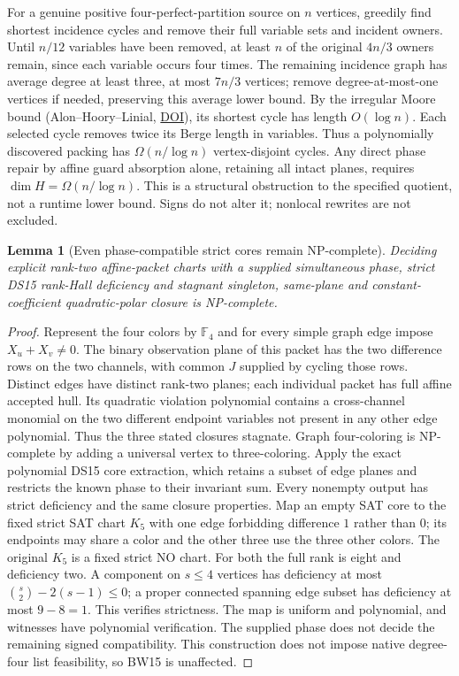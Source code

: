 \documentclass[11pt]{article}
\newtheorem{lemma}[theorem]{Lemma}
\begin{document}
For a genuine positive four-perfect-partition source on $n$ vertices, greedily find shortest incidence cycles and remove their full variable sets and incident owners. Until $n/12$ variables have been removed, at least $n$ of the original $4n/3$ owners remain, since each variable occurs four times. The remaining incidence graph has average degree at least three, at most $7n/3$ vertices; remove degree-at-most-one vertices if needed, preserving this average lower bound. By the irregular Moore bound (Alon--Hoory--Linial, \href{https://doi.org/10.1007/S003730200002}{DOI}), its shortest cycle has length $O(\log n)$. Each selected cycle removes twice its Berge length in variables. Thus a polynomially discovered packing has $\Omega(n/\log n)$ vertex-disjoint cycles. Any direct phase repair by affine guard absorption alone, retaining all intact planes, requires $\dim H=\Omega(n/\log n)$. This is a structural obstruction to the specified quotient, not a runtime lower bound. Signs do not alter it; nonlocal rewrites are not excluded.

\begin{lemma}[Even phase-compatible strict cores remain NP-complete]\label{lem:ba17-hard}
Deciding explicit rank-two affine-packet charts with a supplied simultaneous phase, strict DS15 rank-Hall deficiency and stagnant singleton, same-plane and constant-coefficient quadratic-polar closure is NP-complete.
\end{lemma}
\begin{proof}
Represent the four colors by $\mathbb F_4$ and for every simple graph edge impose $X_u+X_v\ne0$. The binary observation plane of this packet has the two difference rows on the two channels, with common $J$ supplied by cycling those rows. Distinct edges have distinct rank-two planes; each individual packet has full affine accepted hull. Its quadratic violation polynomial contains a cross-channel monomial on the two different endpoint variables not present in any other edge polynomial. Thus the three stated closures stagnate. Graph four-coloring is NP-complete by adding a universal vertex to three-coloring. Apply the exact polynomial DS15 core extraction, which retains a subset of edge planes and restricts the known phase to their invariant sum. Every nonempty output has strict deficiency and the same closure properties. Map an empty SAT core to the fixed strict SAT chart $K_5$ with one edge forbidding difference $1$ rather than $0$; its endpoints may share a color and the other three use the three other colors. The original $K_5$ is a fixed strict NO chart. For both the full rank is eight and deficiency two. A component on $s\le4$ vertices has deficiency at most $\binom{s}{2}-2(s-1)\le0$; a proper connected spanning edge subset has deficiency at most $9-8=1$. This verifies strictness. The map is uniform and polynomial, and witnesses have polynomial verification. The supplied phase does not decide the remaining signed compatibility. This construction does not impose native degree-four list feasibility, so BW15 is unaffected.
\end{proof}
\end{document}
